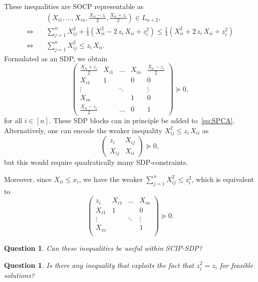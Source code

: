 \documentclass[10pt, a4paper]{article}
\newtheorem{question}[theorem]{Question}
\begin{document}
These inequalities are SOCP representable as
\begin{align*}
  & (X_{i1}, \dots, X_{in}, \tfrac{X_{ii} - z_i}{2}, \tfrac{X_{ii} + z_i}{2}) \in L_{n+2},\\
  \Leftrightarrow\quad & \sum_{j=1}^n X_{ij}^2 + \tfrac{1}{4}(X_{ii}^2 - 2\,
                    z_i\, X_{ii} + z_i^2) \leq \tfrac{1}{4}(X_{ii}^2 + 2\, z_i\, X_{ii} + z_i^2)\\
  \Leftrightarrow\quad & \sum_{j=1}^n X_{ij}^2 \leq z_i\, X_{ii}.
\end{align*}
Formulated as an SDP, we obtain
\[
  \begin{pmatrix}
    \tfrac{X_{ii} + z_i}{2} & X_{i1} & \dots & X_{in} & \tfrac{X_{ii} - z_i}{2}\\
    X_{i1} & 1 &  & 0 & 0\\
    \vdots & & \ddots & & \vdots\\
    X_{in} & &    & 1 & 0\\
    \tfrac{X_{ii} - z_i}{2} & & \dots & 0 & 1
  \end{pmatrix}
  \succeq 0,
\]
for all $i \in [n]$.  These SDP blocks can in principle be added
to~\eqref{eq:SPCA}. Alternatively, one can encode the weaker inequality
$X_{ij}^2 \leq z_i\, X_{ii}$ as
\[
  \begin{pmatrix}
    z_i & X_{ij}\\
    X_{ij} & X_{ii}
  \end{pmatrix}
  \succeq 0,
\]
but this would require quadratically many SDP-constraints.

Moreover, since $X_{ii} \leq x_i$, we have the weaker
$\sum_{j=1}^n X_{ij}^2 \leq z_i^2$, which is equivalent to
\[
  \begin{pmatrix}
    z_i & X_{i1} & \dots & X_{in} \\
    X_{i1} & 1 &  & 0 \\
    \vdots & & \ddots & \vdots \\
    X_{in} & &    & 1 \\
  \end{pmatrix}
  \succeq 0.
\]

\begin{question}
  Can these inequalities be useful within SCIP-SDP?
\end{question}

\begin{question}
  Is there any inequality that exploits the fact that $z_i^2 = z_i$ for
  feasible solutions?
\end{question}
\end{document}
